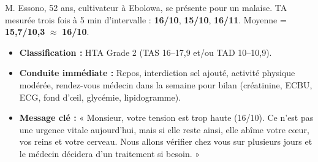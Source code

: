 \documentclass[11pt]{article}
\begin{document}
\begin{exemplebox}
M. Essono, 52 ans, cultivateur à Ebolowa, se présente pour un malaise. TA mesurée trois fois à 5 min d'intervalle : \textbf{16/10}, \textbf{15/10}, \textbf{16/11}. Moyenne = \textbf{15,7/10,3} $\approx$ \textbf{16/10}.
\begin{itemize}
    \item \textbf{Classification :} HTA Grade 2 (TAS 16--17,9 et/ou TAD 10--10,9).
    \item \textbf{Conduite immédiate :} Repos, interdiction sel ajouté, activité physique modérée, rendez-vous médecin dans la semaine pour bilan (créatinine, ECBU, ECG, fond d'œil, glycémie, lipidogramme).
    \item \textbf{Message clé :} « Monsieur, votre tension est trop haute (16/10). Ce n'est pas une urgence vitale aujourd'hui, mais si elle reste ainsi, elle abîme votre cœur, vos reins et votre cerveau. Nous allons vérifier chez vous sur plusieurs jours et le médecin décidera d'un traitement si besoin. »
\end{itemize}
\end{exemplebox}
\end{document}

